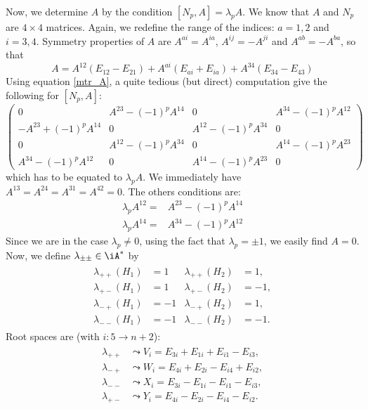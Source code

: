 Now, we determine $A$ by the condition $[N_p,A]=\lambda_pA$. We know that $A$ and $N_p$ are $4\times 4$ matrices. Again, we redefine the range of the indices: $a=1,2$ and $i=3,4$. Symmetry properties of $A$ are $A^{ai}=A^{ia}$, $A^{ij}=-A^{ji}$ and $A^{ab}=-A^{ba}$, so that
\[
	A=A^{12}(E_{12}-E_{21})+A^{ai}(E_{ai}+E_{ia})+A^{34}(E_{34}-E_{43})
\]
Using equation \eqref{mtr_A}, a quite tedious (but direct) computation give the following for $[N_p,A]$:
\begin{equation}\label{grosse_A}
	\begin{pmatrix}
		0                     & A^{23}-(-1)^p A^{14} & 0                    & A^{34}-(-1)^p A^{12} \\
		-A^{23}+(-1)^p A^{14} & 0                    & A^{12}-(-1)^p A^{34} & 0                    \\
		0                     & A^{12}-(-1)^p A^{34} & 0                    & A^{14}-(-1)^p A^{23} \\
		A^{34}-(-1)^p A^{12}  & 0                    & A^{14}-(-1)^p A^{23} & 0
	\end{pmatrix}
\end{equation}
which has to be equated to $\lambda_pA$. We immediately have $A^{13}=A^{24}=A^{31}=A^{42}=0$. The others conditions are:
\begin{subequations}\label{pour_A}
	\begin{align}
		\lambda_pA^{12}= & A^{23}-(-1)^p A^{14} \\
		\lambda_pA^{14}= & A^{34}-(-1)^p A^{12}
	\end{align}
\end{subequations}
Since we are in the case $\lambda_p\neq 0$, using the fact that $\lambda_p=\pm 1$, we easily find $A=0$. Now, we define $\lambda_{\pm\pm}\in\iA^*$ by
\begin{eqnarray}
	\begin{aligned}
		\lambda_{++}(H_1) & =1  & \lambda_{++}(H_2) & =1,  \\
		\lambda_{+-}(H_1) & =1  & \lambda_{+-}(H_2) & =-1, \\
		\lambda_{-+}(H_1) & =-1 & \lambda_{-+}(H_2) & =1,  \\
		\lambda_{--}(H_1) & =-1 & \lambda_{--}(H_2) & =-1.
	\end{aligned}
\end{eqnarray}
Root spaces are (with $i:5\rightarrow n+2$):
\begin{eqnarray}
	\begin{aligned}
		\lambda_{++} & \leadsto V_i=E_{3i}+E_{1i}+E_{i1}-E_{i3}, \\
		\lambda_{-+} & \leadsto W_i=E_{4i}+E_{2i}-E_{i4}+E_{i2}, \\
		\lambda_{--} & \leadsto X_i=E_{3i}-E_{1i}-E_{i1}-E_{i3}, \\
		\lambda_{+-} & \leadsto Y_i=E_{4i}-E_{2i}-E_{i4}-E_{i2}.
	\end{aligned}
\end{eqnarray}


